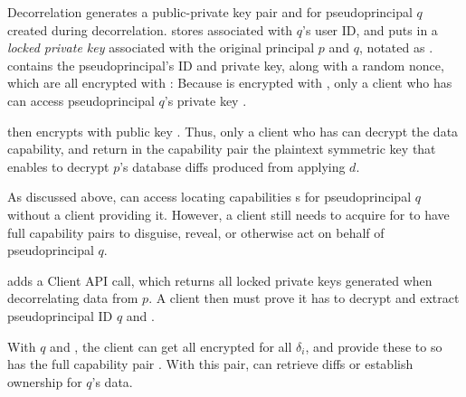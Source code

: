 \iffalse
{}
Decorrelation generates a public-private key pair  and  for pseudoprincipal $q$
created during decorrelation.
\sys stores  associated with $q$'s user ID, and puts  in a \emph{locked private key}
associated with the original principal $p$ and $q$, notated as .  contains the
pseudoprincipal's ID and private key, along with a random nonce, which are all encrypted with :
Because  is encrypted with , only a client who has
 can access pseudoprincipal $q$'s private key .


\sys then encrypts  with public key .  
%
Thus, only a client who has  can decrypt the data capability, and return in the capability pair the plaintext symmetric key that enables \sys to decrypt $p$'s database diffs produced from applying $d$.


As discussed above, \sys can access locating capabilities s for pseudoprincipal $q$ without a
client providing it. 
%
However, a client still needs to acquire  for \sys to have full capability pairs
to disguise, reveal, or otherwise act on behalf of pseudoprincipal $q$.

\sys adds a  Client API call, which returns all locked private
keys  generated when decorrelating data from $p$.
A client then must prove it has  to decrypt  and extract pseudoprincipal ID $q$ and .

With $q$ and , the client can get all encrypted  for all $\delta_i$, and
provide these to \sys so \sys has the full capability pair . With
this pair, \sys can retrieve diffs or establish ownership for $q$'s data.

